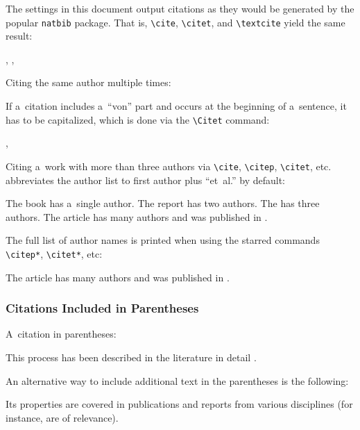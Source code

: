 The settings in this document output citations as they would be generated by the popular \texttt{natbib} package. That is, \verb|\cite|, \verb|\citet|, and \verb|\textcite| yield the same result:
\begin{longtblr}{}
	\cite{sarfraz}, \citet{sarfraz}, \textcite{sarfraz}
\end{longtblr}
\noindent Citing the same author multiple times:
\begin{longtblr}{}
	\cite{aristotle:anima, aristotle:physics, aristotle:poetics} \textellipsis
\end{longtblr}

If a~citation includes a~``von'' part and occurs at the beginning of a~sentence, it has to be capitalized, which is done via the \verb|\Citet| command:
\begin{longtblr}{}
	 \textellipsis, \citet{vangennep} \textellipsis
\end{longtblr}

Citing a~work with more than three authors via \verb|\cite|, \verb|\citep|, \verb|\citet|, etc. abbreviates the author list to first author plus ``et~al.'' by default:
\begin{longtblr}{}
	The book  \citep{gerhardt} has a~single author.
	The report  \citep{chiu} has two authors.
	The  \citep{companion} has three authors.
	The article  \citep{murray} has many authors and was published in \mkbibemph{}.
\end{longtblr}
\noindent The full list of author names is printed when using the starred commands \verb|\citep*|, \verb|\citet*|, etc:
\begin{longtblr}{}
	The article  \citep*{murray} has many authors and was published in \mkbibemph{}.
\end{longtblr}

\subsubsection{Citations Included in Parentheses}

A~citation in parentheses:
\begin{longtblr}{}
	This process has been described in the literature in detail \citep[see][and the references therein]{gerhardt}.
\end{longtblr}
\noindent An alternative way to include additional text in the parentheses is the following:
\begin{longtblr}{}
	Its properties are covered in publications and reports from various disciplines (for instance, \citealp{chiu, markey, padhye, sarfraz} are of relevance).
\end{longtblr}

